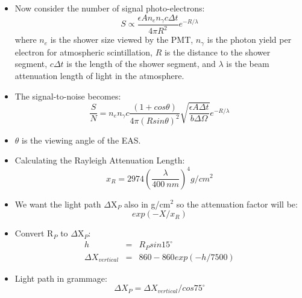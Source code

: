 \begin{itemize}
\item Now consider the number of signal photo-electrons:
\begin{equation}
S \propto \frac{\epsilon A n_{e} n_{\gamma} c \Delta t}{4 \pi R^2} e^{-R/\lambda}
\end{equation}
where $n_e$ is the shower size viewed by the PMT, $n_{\gamma}$ is the photon yield per electron for atmospheric scintillation, $R$ is the distance to the shower segment, $c\Delta t$ is the length of the shower segment, and $\lambda$ is the beam attenuation length of light in the atmosphere.
\item The signal-to-noise becomes:
\begin{equation}
\frac{S}{N} = n_e n_{\gamma} c \frac{(1 + cos\theta)}{4 \pi (R sin\theta)^2} \sqrt{\frac{\epsilon A \Delta t}{b \Delta\Omega}} e^{-R/\lambda}
\end{equation}
\item $\theta$ is the viewing angle of the EAS.
\end{itemize}

\begin{itemize}
\item Calculating the Rayleigh Attenuation Length:
\begin{equation}
x_R = 2974 \left(\frac{\lambda}{400 \ nm} \right)^4 g/cm^2
\end{equation}
\item We want the light path $\Delta$X$_P$ also in g/cm$^2$ so the attenuation factor will be:
\begin{equation}
exp(-X / x_R )
\end{equation}
\item Convert R$_P$ to $\Delta$X$_P$:
\begin{eqnarray}
h &=& R_P sin15^{\circ} \\
\Delta X_{vertical} &=& 860 - 860exp(-h/7500)
\end{eqnarray}
\item Light path in grammage:
\begin{equation}
\Delta X_P = \Delta X_{vertical} / cos75^{\circ}
\end{equation}
\end{itemize}

